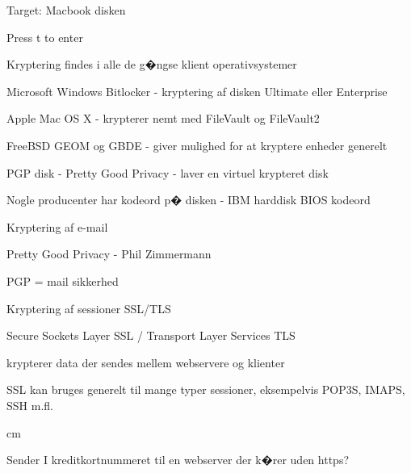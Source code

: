 \documentclass[20pt,landscape,a4paper,footrule]{foils}
\begin{document}


\centerline{Target: Macbook disken}

Press t to enter \smiley\\





\begin{list1}
\item Kryptering findes i alle de g�ngse klient operativsystemer
\begin{list2}
\item Microsoft Windows Bitlocker - kryptering af disken Ultimate eller Enterprise
\item Apple Mac OS X - krypterer nemt med FileVault og FileVault2
\item FreeBSD GEOM og GBDE - giver mulighed for at kryptere enheder
  generelt
\item PGP disk - Pretty Good Privacy - laver en virtuel krypteret disk
\item Nogle producenter har kodeord p� disken - IBM harddisk BIOS kodeord
\end{list2}
\end{list1}





\begin{list1}
\item Kryptering af e-mail
\begin{list2}
\item Pretty Good Privacy - Phil Zimmermann
\item PGP = mail sikkerhed
\end{list2}
\item Kryptering af sessioner SSL/TLS
\begin{list2}
\item Secure Sockets Layer SSL / Transport Layer Services TLS
\item krypterer data der sendes mellem webservere og klienter
\item SSL kan bruges generelt til mange typer sessioner, eksempelvis
  POP3S, IMAPS, SSH m.fl.
\end{list2}
 cm
\item Sender I kreditkortnummeret til en webserver der k�rer uden https?
\end{list1}
\end{document}
